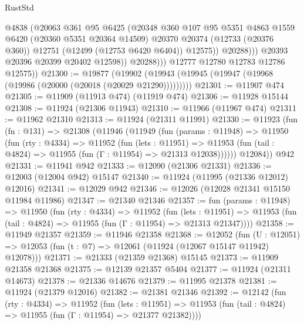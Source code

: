 \begin{lexlean}{RustStd}
\begin{coremodule}
                        @4838
                        (@20063
                          @361
                          @95
                          @6425
                          (@20348
                            @360
                            @107
                            @95
                            @5351
                            @4863
                            @1559
                            @6420
                            (@20360 @5351 @20364 @14509)
                            @20370
                            @20374
                            (@12733 (@20376 @360))
                            @12751
                            (@12499 (@12753 @6420 @6404))
                            @12575))
                        @20288)))
                  @20393
                  @20396
                  @20399
                  @20402
                  @12598))
              @20288)))
        @12777
        @12780
        @12783
        @12786
        @12575))
@21300 := @19877
    (@19902 (@19943 (@19945 (@19947 (@19968 (@19986 (@20000 (@20018 (@20029 @21290)))))))))
@21301 := @11907 @474
@21305 := @11909 (@11913 @474) (@11919 @474)
@21306 := @11928 @15144
@21308 := @11924 (@21306 @11943)
@21310 := @11966 (@11967 @474)
@21311 := @11962 @21310
@21313 := @11924 (@21311 @11991)
@21330 := @11923
    (fun (fn : @131) =>
    @21308
      (@11946
        (@11949
          (fun (params : @11948) =>
          @11950
            (fun (rty : @4334) =>
            @11952
              (fun (lets : @11951) =>
              @11953 (fun (tail : @4824) => @11955 (fun (Γ : @11954) => @21313 @12038))))))
        @12084))
    @942
@21331 := @11941 @942
@21333 := @12090 (@21306 @21331)
@21336 := @12003 (@12004 @942) @15147
@21340 := @11924 (@11995 (@21336 @12012) @12016)
@21341 := @12029 @942
@21346 := @12026 (@12028 @21341 @15150 @11984 @11986)
@21347 := @21340 @21346
@21357 := fun (params : @11948) =>
  @11950
    (fun (rty : @4334) =>
    @11952
      (fun (lets : @11951) =>
      @11953 (fun (tail : @4824) => @11955 (fun (Γ : @11954) => @21313 @21347))))
@21358 := @11949 @21357
@21359 := @11946 @21358
@21368 := @12052
    (fun (U : @12051) => @12053 (fun (t : @7) => @12061 (@11924 (@12067 @15147 @11942) @12078)))
@21371 := @21333 (@21359 @21368) @15145
@21373 := @11909 @21358 @21368
@21375 := @12139 @21357 @5404
@21377 := @11924 (@21311 @14673)
@21378 := @21336 @14676
@21379 := @11995 @21378
@21381 := @11924 (@21379 @12016)
@21382 := @21381 @21346
@21392 := @12142
    (fun (rty : @4334) =>
    @11952
      (fun (lets : @11951) =>
      @11953 (fun (tail : @4824) => @11955 (fun (Γ : @11954) => @21377 @21382))))

\end{coremodule}
\end{lexlean}
